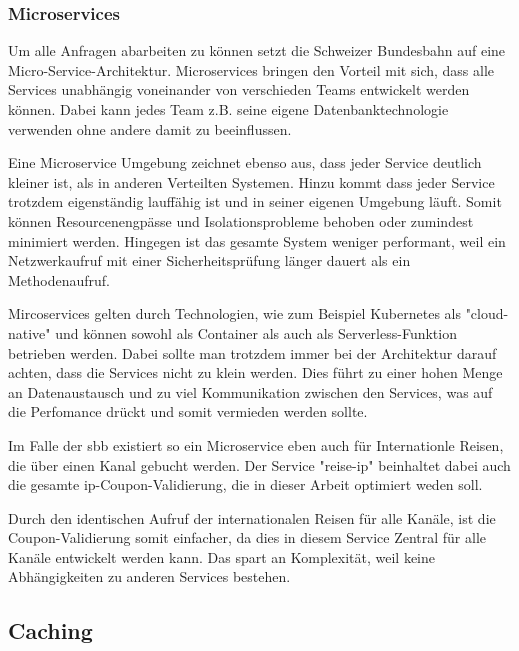 \subsubsection{Microservices}

Um alle Anfragen abarbeiten zu können setzt die Schweizer Bundesbahn auf eine Micro-Service-Architektur. Microservices bringen den Vorteil mit sich, dass alle Services unabhängig voneinander von verschieden Teams entwickelt werden können. Dabei kann jedes Team z.B. seine eigene Datenbanktechnologie verwenden ohne andere damit zu beeinflussen. %

Eine Microservice Umgebung zeichnet ebenso aus, dass jeder Service deutlich kleiner ist, als in anderen Verteilten Systemen. Hinzu kommt dass jeder Service trotzdem eigenständig lauffähig ist und in seiner eigenen Umgebung läuft. Somit können Resourcenengpässe und Isolationsprobleme behoben oder zumindest minimiert werden. Hingegen ist das gesamte System weniger performant, weil ein Netzwerkaufruf mit einer Sicherheitsprüfung länger dauert als ein Methodenaufruf. %

Mircoservices gelten durch Technologien, wie zum Beispiel Kubernetes als "cloud-native" und können sowohl als Container als auch als Serverless-Funktion betrieben werden. %
Dabei sollte man trotzdem immer bei der Architektur darauf achten, dass die Services nicht zu klein werden. Dies führt zu einer hohen Menge an Datenaustausch und zu viel Kommunikation zwischen den Services, was auf die Perfomance drückt und somit vermieden werden sollte. %

Im Falle der \ac{sbb} existiert so ein Microservice eben auch für Internationle Reisen, die über einen Kanal gebucht werden. Der Service "reise-ip" beinhaltet dabei auch die gesamte \ac{ip}-Coupon-Validierung, die in dieser Arbeit optimiert weden soll.

Durch den identischen Aufruf der internationalen Reisen für alle Kanäle, ist die Coupon-Validierung somit einfacher, da dies in diesem Service Zentral für alle Kanäle entwickelt werden kann. Das spart an Komplexität, weil keine Abhängigkeiten zu anderen Services bestehen.


\subsection{Caching}

